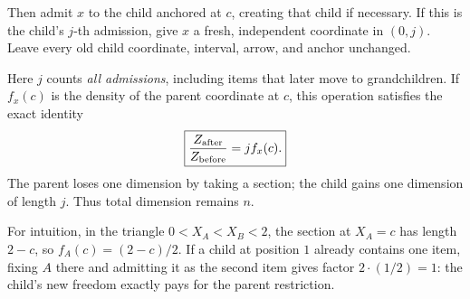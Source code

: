Then admit \(x\) to the child anchored at \(c\), creating that child if necessary. If this is the child's \(j\)-th admission, give \(x\) a fresh, independent coordinate in \((0,j)\). Leave every old child coordinate, interval, arrow, and anchor unchanged.

\begin{center}
\end{center}

Here \(j\) counts \emph{all admissions}, including items that later move to grandchildren. If \(f_x(c)\) is the density of the parent coordinate at \(c\), this operation satisfies the exact identity
\begin{equation}\label{eq:refine}
\boxed{\frac{Z_{\rm after}}{Z_{\rm before}}=j f_x(c).}
\end{equation}
The parent loses one dimension by taking a section; the child gains one dimension of length \(j\). Thus total dimension remains \(n\).

For intuition, in the triangle \(0<X_A<X_B<2\), the section at \(X_A=c\) has length \(2-c\), so \(f_A(c)=(2-c)/2\). If a child at position \(1\) already contains one item, fixing \(A\) there and admitting it as the second item gives factor \(2\cdot(1/2)=1\): the child's new freedom exactly pays for the parent restriction.


